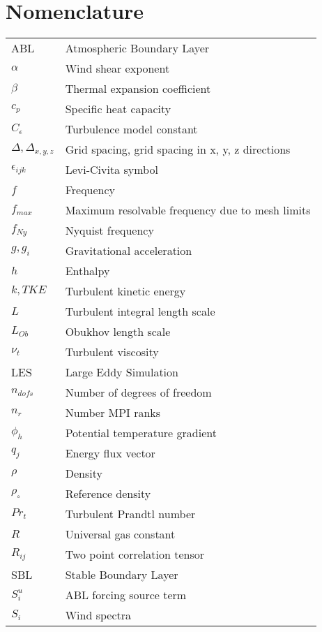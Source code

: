 \documentclass[conf]{new-aiaa}
\begin{document}
\section{Nomenclature}
{\renewcommand\arraystretch{1.0}
  \noindent\begin{longtable*}{@{}l @{\quad=\quad} l@{}}
ABL       & Atmospheric Boundary Layer \\
$\alpha$  & Wind shear exponent  \\
$\beta$   & Thermal expansion coefficient \\
$c_p$     & Specific heat capacity \\
$C_\epsilon$  & Turbulence model constant \\
$\Delta, \Delta_{x,y,z}$  & Grid spacing, grid spacing in x, y, z directions \\
$\epsilon_{ijk}$ & Levi-Civita symbol\\
$f$       & Frequency \\
$f_{max}$  & Maximum resolvable frequency due to mesh limits \\
$f_{Ny}$   & Nyquist frequency \\
$g, g_i$   & Gravitational acceleration \\
$h$       & Enthalpy \\
$k, TKE$  & Turbulent kinetic energy \\
$L$       & Turbulent integral length scale \\
$L_{Ob}$   & Obukhov length scale \\
$\nu_t$   & Turbulent viscosity \\
LES       & Large Eddy Simulation \\
$n_{dofs}$ & Number of degrees of freedom \\
$n_r$     & Number MPI ranks \\
$\phi_h$  & Potential temperature gradient \\
$q_j$     & Energy flux vector\\
$\rho$    & Density \\
$\rho_\circ$ & Reference density  \\
$Pr_t$    & Turbulent Prandtl number \\
$R$       & Universal gas constant \\
$R_{ij}$   & Two point correlation tensor \\
SBL       & Stable Boundary Layer \\
$S^u_i$    & ABL forcing source term \\
$S_i$     & Wind spectra \\

\end{longtable*}}
\end{document}
